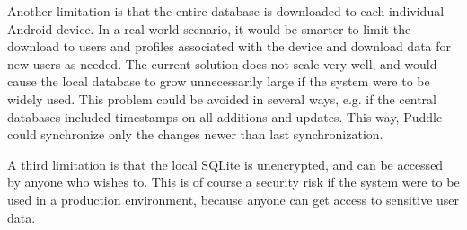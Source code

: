 Another limitation is that the entire database is downloaded to each individual Android device. In a real world scenario, it would be smarter to limit the download to users and profiles associated with the device and download data for new users as needed. The current solution does not scale very well, and would cause the local database to grow unnecessarily large if the system were to be widely used. This problem could be avoided in several ways, e.g. if the central databases included timestamps on all additions and updates. This way, Puddle could synchronize only the changes newer than last synchronization.

A third limitation is that the local SQLite is unencrypted, and can be accessed by anyone who wishes to. This is of course a security risk if the system were to be used in a production environment, because anyone can get access to sensitive user data.
